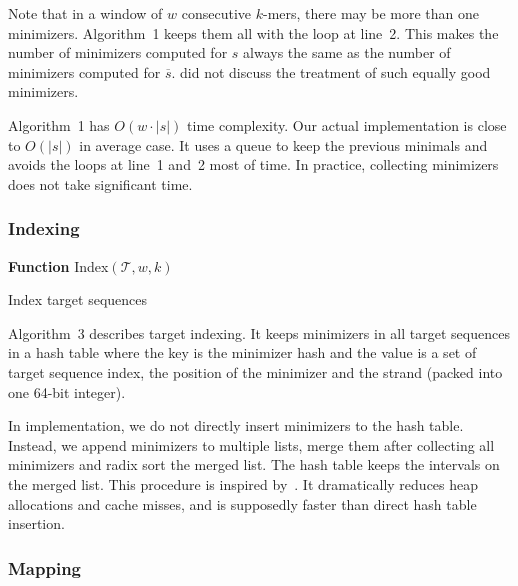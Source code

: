 \documentclass{bioinfo}
\begin{document}
\begin{methods}
Note that in a window of $w$ consecutive $k$-mers, there may be more than one
minimizers. Algorithm~1 keeps them all with the loop at line~2. This makes the
number of minimizers computed for $s$ always the same as the number of
minimizers computed for $\overline{s}$. \citet{Roberts:2004fv} did not discuss
the treatment of such equally good minimizers.

Algorithm~1 has $O(w\cdot|s|)$ time complexity. Our actual implementation is
close to $O(|s|)$ in average case. It uses a queue to keep the previous
minimals and avoids the loops at line~1 and~2 most of time. In practice,
collecting minimizers does not take significant time.

\subsubsection{Indexing}

\begin{algorithm}[ht]
\DontPrintSemicolon
\footnotesize
{}
\BlankLine
\textbf{Function} {\sc Index}$(\mathcal{T},w,k)$
\caption{Index target sequences}
\end{algorithm}

Algorithm~3 describes target indexing. It keeps minimizers in all target
sequences in a hash table where the key is the minimizer hash and the value is
a set of target sequence index, the position of the minimizer and the strand
(packed into one 64-bit integer).

In implementation, we do not directly insert minimizers to the hash table.
Instead, we append minimizers to multiple lists, merge them after collecting
all minimizers and radix sort the merged list. The hash table keeps the
intervals on the merged list. This procedure is inspired
by~\citet{DBLP:conf/wabi/Myers14}. It dramatically reduces heap allocations and
cache misses, and is supposedly faster than direct hash table insertion.

\subsubsection{Mapping}


\end{methods}
\end{document}

